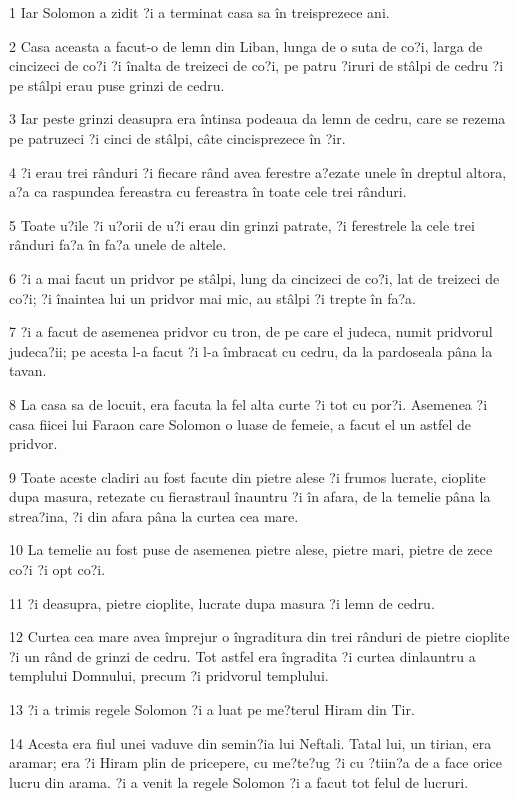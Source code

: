 \par 1 Iar Solomon a zidit ?i a terminat casa sa în treisprezece ani.
\par 2 Casa aceasta a facut-o de lemn din Liban, lunga de o suta de co?i, larga de cincizeci de co?i ?i înalta de treizeci de co?i, pe patru ?iruri de stâlpi de cedru ?i pe stâlpi erau puse grinzi de cedru.
\par 3 Iar peste grinzi deasupra era întinsa podeaua da lemn de cedru, care se rezema pe patruzeci ?i cinci de stâlpi, câte cincisprezece în ?ir.
\par 4 ?i erau trei rânduri ?i fiecare rând avea ferestre a?ezate unele în dreptul altora, a?a ca raspundea fereastra cu fereastra în toate cele trei rânduri.
\par 5 Toate u?ile ?i u?orii de u?i erau din grinzi patrate, ?i ferestrele la cele trei rânduri fa?a în fa?a unele de altele.
\par 6 ?i a mai facut un pridvor pe stâlpi, lung da cincizeci de co?i, lat de treizeci de co?i; ?i înaintea lui un pridvor mai mic, au stâlpi ?i trepte în fa?a.
\par 7 ?i a facut de asemenea pridvor cu tron, de pe care el judeca, numit pridvorul judeca?ii; pe acesta l-a facut ?i l-a îmbracat cu cedru, da la pardoseala pâna la tavan.
\par 8 La casa sa de locuit, era facuta la fel alta curte ?i tot cu por?i. Asemenea ?i casa fiicei lui Faraon care Solomon o luase de femeie, a facut el un astfel de pridvor.
\par 9 Toate aceste cladiri au fost facute din pietre alese ?i frumos lucrate, cioplite dupa masura, retezate cu fierastraul înauntru ?i în afara, de la temelie pâna la strea?ina, ?i din afara pâna la curtea cea mare.
\par 10 La temelie au fost puse de asemenea pietre alese, pietre mari, pietre de zece co?i ?i opt co?i.
\par 11 ?i deasupra, pietre cioplite, lucrate dupa masura ?i lemn de cedru.
\par 12 Curtea cea mare avea împrejur o îngraditura din trei rânduri de pietre cioplite ?i un rând de grinzi de cedru. Tot astfel era îngradita ?i curtea dinlauntru a templului Domnului, precum ?i pridvorul templului.
\par 13 ?i a trimis regele Solomon ?i a luat pe me?terul Hiram din Tir.
\par 14 Acesta era fiul unei vaduve din semin?ia lui Neftali. Tatal lui, un tirian, era aramar; era ?i Hiram plin de pricepere, cu me?te?ug ?i cu ?tiin?a de a face orice lucru din arama. ?i a venit la regele Solomon ?i a facut tot felul de lucruri.
